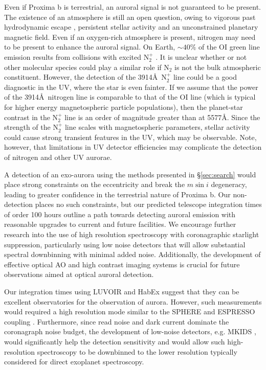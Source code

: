 \documentclass[apjl]{emulateapj}
\begin{document}
Even if Proxima b is terrestrial, an auroral signal is not guaranteed to be present. The existence of an atmosphere is still an open question, owing to vigorous past hydrodynamic escape \citep{LugerBarnes2015, Barnes2016}, persistent stellar activity \citep{Davenport2016} and an unconstrained planetary magnetic field. Even if an oxygen-rich atmosphere is present, nitrogen may need to be present to enhance the auroral signal. On Earth, ${\sim}40\%$ of the OI green line emission results from collisions with excited N$_2^+$ \citep{Strickland2000}. It is unclear whether or not other molecular species could play a similar role if N$_2$ is not the bulk atmospheric constituent. However, the detection of the 3914\AA\ N$_2^+$ line could be a good diagnostic in the UV, where the star is even fainter. If we assume that the power of the 3914\AA\ nitrogen line is comparable to that of the OI line (which is typical for higher energy magnetospheric particle populations), then the planet-star contrast in the N$_2^+$ line is an order of magnitude greater than at 5577\AA. Since the strength of the N$_2^+$ line scales with magnetospheric parameters, stellar activity could cause strong transient features in the UV, which may be observable. Note, however, that limitations in UV detector efficiencies may complicate the detection of nitrogen and other UV aurorae.

A detection of an exo-aurora using the methods presented in \S\ref{sec:search} would place strong constraints on the eccentricity and break the $m {\sin} i$ degeneracy, leading to greater confidence in the terrestrial nature of Proxima b. Our non-detection places no such constraints, but our predicted telescope integration times of order 100 hours outline a path towards detecting auroral emission with reasonable upgrades to current and future facilities. We encourage further research into the use of high resolution spectroscopy with coronagraphic starlight suppression, particularly using low noise detectors that will allow substantial spectral downbinning with minimal added noise. Additionally, the development of effective optical AO and high contrast imaging systems is crucial for future observations aimed at optical auroral detection. 

Our integration times using LUVOIR and HabEx suggest that they can be excellent observatories for the observation of aurora.  However, such measurements would required a high resolution mode similar to the SPHERE and ESPRESSO coupling \citep{Lovis2016}.  Furthermore, since read noise and dark current dominate the coronagraph noise budget, the development of low-noise detectors, e.g. MKIDS \citep{Mazin2012,Mazin2015}, would significantly help the detection sensitivity and would allow such high-resolution spectroscopy to be downbinned to the lower resolution typically considered for direct exoplanet spectroscopy.
\end{document}
